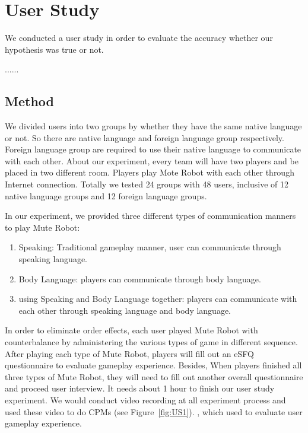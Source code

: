 \section{User Study}

We conducted a user study in order to evaluate the accuracy whether our hypothesis was true or not.

......

\subsection{Method}

We divided users into two groups by whether they have the same native language or not. So there are native language and foreign language group respectively. Foreign language group are required to use their native language to communicate with each other. About our experiment, every team will have two players and be placed in two different room. Players play Mote Robot with each other through Internet connection. Totally we tested 24 groups with 48 users, inclusive of 12 native language groups and 12 foreign language groups.

In our experiment, we provided three different types of communication manners to play Mute Robot:
\begin{enumerate}
    \item Speaking: 
    Traditional gameplay manner, user can communicate through speaking language.
    \item Body Language: 
    players can communicate through body language.
    \item using Speaking and Body Language together: 
    players can communicate with each other through speaking language and body language.
\end{enumerate}

In order to eliminate order effects, each user played Mute Robot with counterbalance by administering the various types of game in different sequence. After playing each type of Mute Robot, players will fill out an eSFQ\cite{} questionnaire to evaluate gameplay experience. Besides, When players finished all three types of Mute Robot, they will need to fill out another overall questionnaire and proceed user interview. It needs about 1 hour to finish our user study experiment. We would conduct video recording at all experiment process and used these video to do CPMs\cite{} (see Figure~\ref{fig:US1}). , which used to evaluate user gameplay experience.


